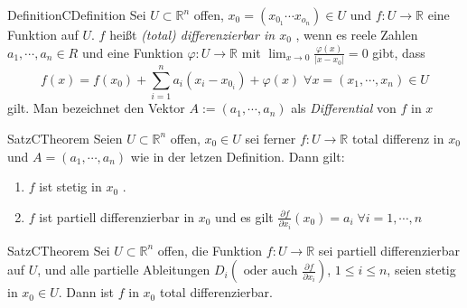 
%

%
\begin{ibox}[]{Definition}{CDefinition}
    Sei $ U \subset \mathbb{R}^n  $ offen, $ x_0 = \left( x_{0_{1}} \cdots x_{o_{n}}  \right) \in U $ und 
	$ f : U \to \mathbb{R}  $ eine Funktion auf $ U $. $ f $ heißt \textit{(total) differenzierbar in $ x_0 $ }, 
	wenn es reele Zahlen $ a_1, \cdots , a_{n} \in R $ und eine Funktion $ \varphi : U \to \mathbb{R}  $ mit 
$ \lim_{x \to 0} \frac{\varphi (x)}{|x -x_0|}  = 0 $ gibt, dass
	$$ f(x) = f(x_0) + \sum_{i=1}^{n}a_{i}(x_{i}-x_{0_{i}}) + \varphi(x) \;
	\forall x=\left( x_1, \cdots , x_{n} \right) \in U  $$ 
	gilt. Man bezeichnet den Vektor $ A:=\left( a_1, \cdots, a_{n} \right) $ als \textit{Differential} von $ f \text{ in } x $ 
\end{ibox}
\begin{ibox}[30]{Satz}{CTheorem}
    Seien $ U \subset \mathbb{R}^n  $ offen, $ x_0 \in U $ sei ferner $ f: U \to \mathbb{R}  $ total differenz
	in $ x_0 $ und $ A = \left( a_1, \cdots, a_{n} \right)  $ wie in der letzen Definition. Dann gilt:
	\begin{enumerate}[label=\alph*)]
		\item $ f $ ist stetig in $ x_0 $ .
		\item $ f $ ist partiell differenzierbar in $ x_0 $ und es gilt $ \frac{\partial f}{\partial x_{i}} (x_0) = a_{i} 
			 \; \forall i = 1, \cdots, n $ 
	\end{enumerate}
\end{ibox}
\begin{ibox}[31]{Satz}{CTheorem}
    Sei $ U \subset \mathbb{R}^n  $ offen, die Funktion $ f: U \to \mathbb{R}  $ sei partiell differenzierbar auf 
	$ U $, und alle partielle Ableitungen $ D_i \left( \text{ oder auch }  \frac{\partial f}{\partial x_i} \right)  $,
	 $ 1 \leq i \leq n $, seien stetig in $ x_0 \in U $. Dann ist $ f $ in 
	$ x_0 $ total differenzierbar.
\end{ibox}

